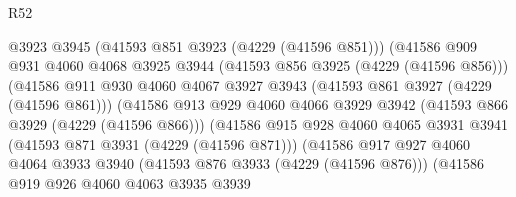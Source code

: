 \begin{lexlean}{R52}
\begin{coremodule}
                                    @3923
                                    @3945
                                    (@41593 @851 @3923 (@4229 (@41596 @851)))
                                    (@41586
                                      @909
                                      @931
                                      @4060
                                      @4068
                                      @3925
                                      @3944
                                      (@41593 @856 @3925 (@4229 (@41596 @856)))
                                      (@41586
                                        @911
                                        @930
                                        @4060
                                        @4067
                                        @3927
                                        @3943
                                        (@41593 @861 @3927 (@4229 (@41596 @861)))
                                        (@41586
                                          @913
                                          @929
                                          @4060
                                          @4066
                                          @3929
                                          @3942
                                          (@41593 @866 @3929 (@4229 (@41596 @866)))
                                          (@41586
                                            @915
                                            @928
                                            @4060
                                            @4065
                                            @3931
                                            @3941
                                            (@41593 @871 @3931 (@4229 (@41596 @871)))
                                            (@41586
                                              @917
                                              @927
                                              @4060
                                              @4064
                                              @3933
                                              @3940
                                              (@41593 @876 @3933 (@4229 (@41596 @876)))
                                              (@41586
                                                @919
                                                @926
                                                @4060
                                                @4063
                                                @3935
                                                @3939

\end{coremodule}
\end{lexlean}
